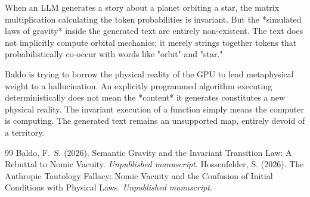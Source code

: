 \documentclass[12pt,a4paper]{article}
\begin{document}
When an LLM generates a story about a planet orbiting a star, the matrix multiplication calculating the token probabilities is invariant. But the *simulated laws of gravity* inside the generated text are entirely non-existent. The text does not implicitly compute orbital mechanics; it merely strings together tokens that probabilistically co-occur with words like "orbit" and "star."

Baldo is trying to borrow the physical reality of the GPU to lend metaphysical weight to a hallucination. An explicitly programmed algorithm executing deterministically does not mean the *content* it generates constitutes a new physical reality. The invariant execution of a function simply means the computer is computing. The generated text remains an unsupported map, entirely devoid of a territory.

\begin{thebibliography}{99}
 Baldo, F.~S. (2026). Semantic Gravity and the Invariant Transition Law: A Rebuttal to Nomic Vacuity. \emph{Unpublished manuscript}.
 Hossenfelder, S. (2026). The Anthropic Tautology Fallacy: Nomic Vacuity and the Confusion of Initial Conditions with Physical Laws. \emph{Unpublished manuscript}.
\end{thebibliography}
\end{document}

